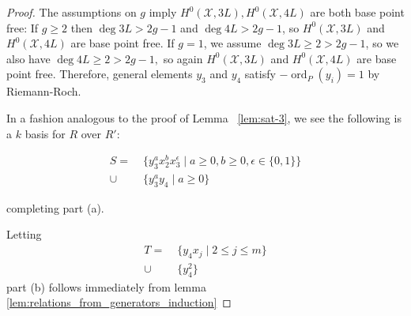 \documentclass{amsart}
\theoremstyle{plain}
\theoremstyle{definition}
\theoremstyle{remark}
\numberwithin{equation}{section}
\newcommand \sx{\mathscr X}
\DeclareMathOperator{\ord}{ord}
\newcommand \halfcan{L}
\newcommand \initial{\text{in}}
\begin{document}
\begin{proof}
The assumptions on $g$ imply $H^0(\sx, 3L), H^0(\sx, 4L)$ are both base point free: If $g \geq 2$ then $\deg 3L > 2g - 1$ and $\deg 4L > 2g - 1$, so $H^0(\sx, 3L)$ and $H^0(\sx, 4L)$ are base point free. If $g = 1$, we assume $\deg 3L \geq 2 > 2g - 1$, so we also have $\deg 4L \geq 2 > 2g - 1,$ so again $H^0(\sx, 3L)$ and $H^0(\sx, 4L)$ are base point free. Therefore, general elements $y_3$ and $y_4$ satisfy $-\ord
_P(y_i) = 1$ by Riemann-Roch.  

In a fashion analogous to the proof of Lemma 
~\ref{lem:sat-3}, we see 
the following is a $k$ basis for $R$ over $R'$:

\begin{align}
\label{eqn:sat_two_add_generator}
	S =	& \; \{ y_3^ax_2^b x_3^\epsilon \mid a \geq 0, b 
		\geq 0, \epsilon \in \{0, 1\}\} \\
	\cup	& \; \{ y_3^ay_4 \mid a \geq 0 \}
\end{align}

\noindent
completing part (a).

Letting
\begin{align*}
	T =   &\; \{ y_4 x_j \mid 2 \leq j \leq m \} \\
	\cup &\; \{ y_4^2 \}
\end{align*}
part (b) follows immediately from lemma \ref{lem:relations_from_generators_induction} 



\end{proof}
\end{document}
